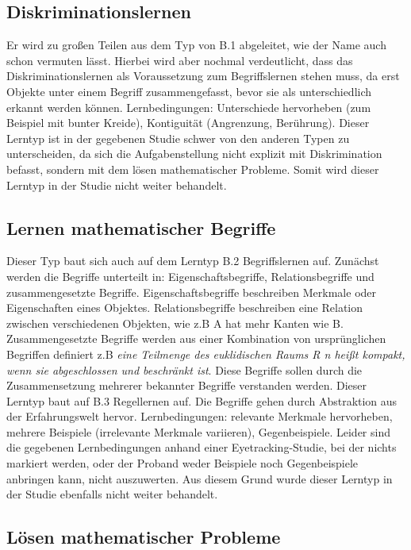 \subsection[]{Diskriminationslernen}

Er wird zu großen Teilen aus dem Typ von B.1 abgeleitet, wie der Name auch schon vermuten lässt. Hierbei wird aber nochmal verdeutlicht, dass das Diskriminationslernen als Voraussetzung zum Begriffslernen stehen muss, da erst Objekte unter einem Begriff zusammengefasst, bevor sie als unterschiedlich erkannt werden können.
Lernbedingungen: Unterschiede hervorheben (zum Beispiel mit bunter Kreide), Kontiguität (Angrenzung, Berührung)\cite{DudenKontiguitaet}.
Dieser Lerntyp ist in der gegebenen Studie schwer von den anderen Typen zu unterscheiden, da sich die Aufgabenstellung nicht explizit mit Diskrimination befasst, sondern mit dem lösen mathematischer Probleme. Somit wird dieser Lerntyp in der Studie nicht weiter behandelt\cite{zech1983grundkurs}.

\subsection[]{Lernen mathematischer Begriffe}

Dieser Typ baut sich auch auf dem Lerntyp B.2 Begriffslernen auf. Zunächst werden die Begriffe unterteilt in: Eigenschaftsbegriffe, Relationsbegriffe und zusammengesetzte Begriffe. Eigenschaftsbegriffe beschreiben Merkmale oder Eigenschaften eines Objektes. Relationsbegriffe beschreiben eine Relation zwischen verschiedenen Objekten, wie z.B A hat mehr Kanten wie B. Zusammengesetzte Begriffe werden aus einer Kombination von ursprünglichen Begriffen definiert z.B \textit {eine Teilmenge des euklidischen Raums R n heißt kompakt, wenn sie abgeschlossen und beschränkt ist}. Diese Begriffe sollen durch die Zusammensetzung mehrerer bekannter Begriffe verstanden werden. Dieser Lerntyp baut auf B.3 Regellernen auf. Die Begriffe gehen durch Abstraktion aus der Erfahrungswelt hervor.
Lernbedingungen: relevante Merkmale hervorheben, mehrere Beispiele (irrelevante Merkmale variieren), Gegenbeispiele.
Leider sind die gegebenen Lernbedingungen anhand einer Eyetracking-Studie, bei der nichts markiert werden, oder der Proband weder Beispiele noch Gegenbeispiele anbringen kann, nicht auszuwerten. Aus diesem Grund wurde dieser Lerntyp in der Studie ebenfalls nicht weiter behandelt\cite{zech1983grundkurs}. 

\subsection[]{Lösen mathematischer Probleme}


